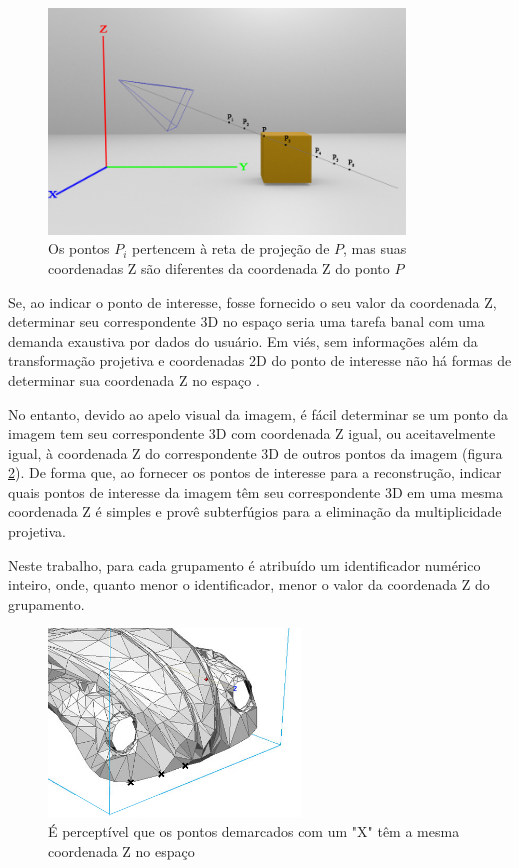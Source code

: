 	\begin{figure}[!htb]
		\centering
		\includegraphics[height=6cm]{imagens/cenaExemploUnicoPontoPorPlano.png}
		\caption{Os pontos $P_i$ pertencem à reta de projeção de $P$, mas suas coordenadas Z são diferentes da coordenada Z do ponto $P$}
		\label{imagemUnicoPontoPorPlano}
	\end{figure}
	
	Se, ao indicar o ponto de interesse, fosse fornecido o seu valor da coordenada Z, determinar seu correspondente 3D no espaço seria uma tarefa banal com uma demanda exaustiva por dados do usuário. Em viés, sem informações além da transformação projetiva e coordenadas 2D do ponto de interesse não há formas de determinar sua coordenada Z no espaço \cite{foto3D}.
	
	No entanto, devido ao apelo visual da imagem, é fácil determinar se um ponto da imagem tem seu correspondente 3D com coordenada Z igual, ou aceitavelmente igual, à coordenada Z do correspondente 3D de outros pontos da imagem (figura \ref{imagemPontosMesmoPlano}). De forma que, ao fornecer os pontos de interesse para a reconstrução, indicar quais pontos de interesse da imagem têm seu correspondente 3D em uma mesma coordenada Z é simples e provê subterfúgios para a eliminação da multiplicidade projetiva.
	
	Neste trabalho, para cada grupamento é atribuído um identificador numérico inteiro, onde, quanto menor o identificador, menor o valor da coordenada Z do grupamento.
	
	\begin{figure}[!htb]
		\centering
		\includegraphics[height=5cm]{imagens/pontosMesmoPlano.png}
		\caption{É perceptível que os pontos demarcados com um "X" têm a mesma coordenada Z no espaço}
		\label{imagemPontosMesmoPlano}
	\end{figure}
	
